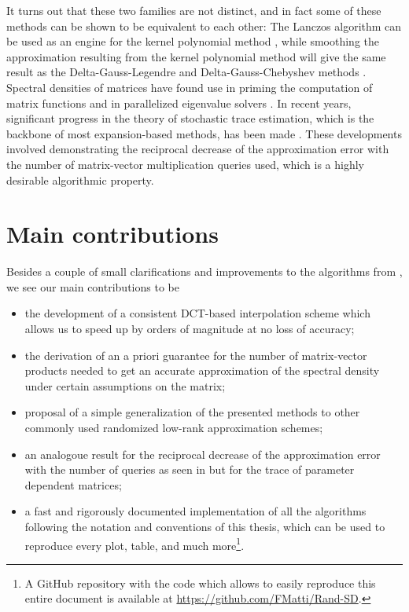 It turns out that these two families are not distinct, and in fact some of these
methods can be shown to be equivalent to each other: The Lanczos algorithm
can be used as an engine for the kernel polynomial method \cite{chen2023kpm},
while smoothing the approximation resulting from the kernel polynomial method 
will give the same result as the Delta-Gauss-Legendre and Delta-Gauss-Chebyshev
methods \cite{lin2016review}.\\ 

Spectral densities of matrices have found use in priming the computation of matrix
functions \cite{fan2020spectrum} and in parallelized eigenvalue solvers
\cite{polizzi2009density, li2019slicing}. In recent years, significant progress
in the theory of stochastic trace estimation, which is the backbone of most
expansion-based methods, has been made \cite{meyer2021hutch, persson2022hutch}.
These developments involved demonstrating the reciprocal decrease
of the approximation error with the number of matrix-vector multiplication
queries used, which is a highly desirable algorithmic property.


\section{Main contributions}
\label{sec:1-introduction-contributions}

Besides a couple of small clarifications and improvements to the algorithms 
from \cite{lin2017randomized}, we see our main contributions to be

\begin{itemize}
    \item the development of a consistent \gls{DCT}-based interpolation scheme which allows us
          to speed up \cite[algorithm~5]{lin2017randomized} by orders of magnitude
          at no loss of accuracy;
    \item the derivation of an a priori guarantee for the number of matrix-vector
          products needed to get an accurate approximation of the spectral
          density under certain assumptions on the matrix;
    \item proposal of a simple generalization of the presented methods to other
          commonly used randomized low-rank approximation schemes;
    \item an analogoue result for the reciprocal decrease of the approximation
          error with the number of queries as seen in \cite[theorem~1]{meyer2021hutch}
          but for the trace of parameter dependent matrices;
    \item a fast and rigorously documented implementation of all the algorithms
          following the notation and conventions of this thesis, which can be used to
          reproduce every plot, table, and much more\footnote{A GitHub repository
          with the code which allows to easily reproduce this entire document
          is available at \url{https://github.com/FMatti/Rand-SD}.}.
\end{itemize}

